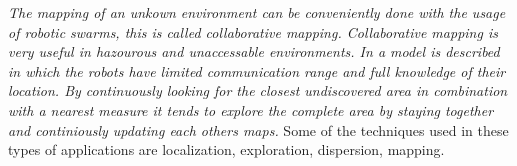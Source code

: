 \emph{The mapping of an unkown environment can be conveniently done with the usage of robotic swarms, this is called collaborative mapping. Collaborative mapping is very useful in hazourous and unaccessable environments.\cite{hardin2004modified} In \cite{sheng2006distributed} a model is described in which the robots have limited communication range and full knowledge of their location. By continuously looking for the closest undiscovered area in combination with a nearest measure it tends to explore the complete area by staying together and continiously updating each others maps.}
Some of the techniques used in these types of applications are localization, exploration, dispersion, mapping. \cite{sheng2006distributed,rothermich2005distributed} 
